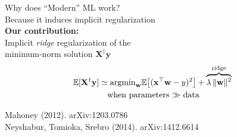 \documentclass{beamer}
\newcommand{\argmin}{\text{argmin}}
\begin{document}
\begin{frame}
\begin{columns}
\begin{column}{0.5\textwidth}
Why does ``Modern'' ML work?\\
Because it induces implicit regularization\\[11mm]
\textbf{Our contribution:}\\
Implicit \textit{ridge} regularization of the\\
minimum-norm solution $\mathbf{X}^\dagger\mathbf{y}$
\vspace{3mm}
  \begin{align*}
    \hspace{-2mm}\mathbb{E}[\mathbf{X}^\dagger\mathbf{y}]
    &\simeq
      \argmin_{\mathbf{w}}\mathbb{E}\big[(\mathbf{x}^\top\mathbf{w}-y)^2\big] + \overbrace{\lambda
    \,\|\mathbf{w}\|^2}^{\text{ridge}}\\
&\quad\text{when parameters $\gg$ data}
  \end{align*}
  \vspace{7mm}

  {\footnotesize
    Mahoney (2012). arXiv:1203.0786\\
    Neyshabur, Tomioka, Srebro (2014). arXiv:1412.6614\\
    }
\end{column}
\end{columns}
 
\end{frame}
\end{document}

